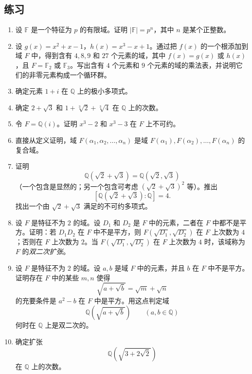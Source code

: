 \subsection*{练习}
\begin{enumerate}[label=\arabic*.]
	\item 设 $\mathbb F$ 是一个特征为 $p$ 的有限域。证明 $|\mathbb F|=p^n$，其中 $n$ 是某个正整数。
	
	\item 设 $g(x)=x^2+x-1$，$h(x)=x^3-x+1$。通过把 $f(x)$ 的一个根添加到域 $F$ 中，得到含有 $4,8,9$ 和 $27$ 个元素的域，其中 $f(x)=g(x)$ 或 $h(x)$，且 $F=\mathbb F_2$ 或 $\mathbb F_3$。写出含有 $4$ 个元素和 $9$ 个元素的域的乘法表，并说明它们的非零元素构成一个循环群。
	
	\item 确定元素 $1+i$ 在 $\mathbb Q$ 上的极小多项式。
	
	\item 确定 $2+\sqrt3$ 和 $1+\sqrt[3]{2}+\sqrt[3]{4}$ 在 $\mathbb Q$ 上的次数。
	
	\item 令 $F=\mathbb Q(i)$。证明 $x^3-2$ 和 $x^3-3$ 在 $F$ 上不可约。
	
	\item 直接从定义证明，域 $F(\alpha_1,\alpha_2,\ldots,\alpha_n)$ 是域 $F(\alpha_1),F(\alpha_2),\ldots,F(\alpha_n)$ 的复合域。
	
	\item 证明
	\[
	\mathbb Q(\sqrt2+\sqrt3)=\mathbb Q(\sqrt2,\sqrt3)
	\]
	（一个包含是显然的；另一个包含可考虑 $(\sqrt2+\sqrt3)^2$ 等）。推出
	\[
	[\mathbb Q(\sqrt2+\sqrt3):\mathbb Q]=4.
	\]
	找出一个由 $\sqrt2+\sqrt3$ 满足的不可约多项式。
	
	\item 设 $F$ 是特征不为 $2$ 的域。设 $D_1$ 和 $D_2$ 是 $F$ 中的元素，二者在 $F$ 中都不是平方。证明：若 $D_1D_2$ 在 $F$ 中不是平方，则 $F(\sqrt{D_1},\sqrt{D_2})$ 在 $F$ 上次数为 $4$；否则在 $F$ 上次数为 $2$。当 $F(\sqrt{D_1},\sqrt{D_2})$ 在 $F$ 上次数为 $4$ 时，该域称为 $F$ 的\emph{双二次扩张}。
	
	\item 设 $F$ 是特征不为 $2$ 的域。设 $a,b$ 是域 $F$ 中的元素，并且 $b$ 在 $F$ 中不是平方。证明存在 $F$ 中的某些 $m,n$ 使得
	\[
	\sqrt{a+\sqrt b}=\sqrt m+\sqrt n
	\]
	的充要条件是 $a^2-b$ 在 $F$ 中是平方。用这点判定域
	\[
	\mathbb Q(\sqrt{a+\sqrt b})\qquad (a,b\in\mathbb Q)
	\]
	何时在 $\mathbb Q$ 上是双二次的。
	
	\item 确定扩张
	\[
	\mathbb Q(\sqrt{3+2\sqrt2})
	\]
	在 $\mathbb Q$ 上的次数。
	

\end{enumerate}
